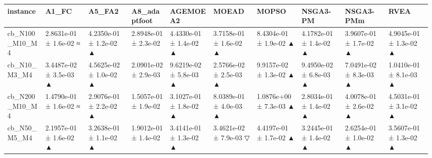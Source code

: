 \begin{tabular}{llllllllll}
\toprule
instance & A1\_FC & A5\_FA2 & A8\_adaptfoot & AGEMOEA2 & MOEAD & MOPSO & NSGA3-PM & NSGA3-PMm & RVEA \\
\midrule
cb\_N100\_M10\_M4 & 2.8631e-01 ± 1.6e-02 ≈ & 4.2350e-01 ± 1.2e-02 ▲ & 2.8948e-01 ± 2.3e-02 & 4.4330e-01 ± 1.4e-02 ▲ & 3.7158e-01 ± 1.6e-02 ▲ & 8.4304e-01 ± 1.9e-02 ▲ & 4.1782e-01 ± 1.4e-02 ▲ & 3.9607e-01 ± 1.7e-02 ▲ & 4.9045e-01 ± 1.3e-02 ▲ \\
cb\_N10\_M3\_M4 & 3.4487e-02 ± 3.5e-03 ▲ & 4.5625e-02 ± 1.0e-02 ▲ & 2.0901e-02 ± 2.9e-03 & 9.6219e-02 ± 5.8e-03 ▲ & 2.5766e-02 ± 2.5e-03 ▲ & 9.9157e-02 ± 1.3e-02 ▲ & 9.4950e-02 ± 6.8e-03 ▲ & 7.0491e-02 ± 8.3e-03 ▲ & 1.0410e-01 ± 8.1e-03 ▲ \\
cb\_N200\_M10\_M4 & 1.4790e-01 ± 1.6e-02 ≈ & 2.9076e-01 ± 2.2e-02 ▲ & 1.5057e-01 ± 1.9e-02 & 3.1027e-01 ± 1.8e-02 ▲ & 8.0389e-01 ± 4.0e-03 ▲ & 1.0876e+00 ± 7.3e-03 ▲ & 2.8034e-01 ± 1.4e-02 ▲ & 4.0078e-01 ± 2.6e-02 ▲ & 4.5031e-01 ± 3.1e-02 ▲ \\
cb\_N50\_M5\_M4 & 2.1957e-01 ± 1.6e-02 ▲ & 3.2638e-01 ± 1.1e-02 ▲ & 1.9012e-01 ± 1.4e-02 & 3.4141e-01 ± 1.3e-02 ▲ & 3.4621e-02 ± 7.9e-03 ▽ & 4.4197e-01 ± 1.7e-02 ▲ & 3.2445e-01 ± 1.4e-02 ▲ & 2.6254e-01 ± 1.0e-02 ▲ & 3.5607e-01 ± 1.3e-02 ▲ \\
\bottomrule
\end{tabular}
